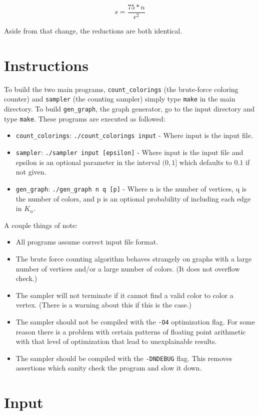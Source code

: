 \documentclass[14]{article}
\begin{document}
\[ s = \frac{75*n}{\epsilon^2} \]

Aside from that change, the reductions are both identical.

\section{Instructions}
To build the two main programs, \texttt{count\_colorings} (the brute-force coloring counter) and \texttt{sampler} (the counting sampler) simply type \texttt{make} in the main directory. To build \texttt{gen\_graph}, the graph generator, go to the input directory and type \texttt{make}. These programs are executed as followed:
\begin{itemize}
\item \texttt{count\_colorings}: \texttt{./count\_colorings input} - Where input is the input file.
\item \texttt{sampler}: \texttt{./sampler input [epsilon]} - Where input is the input file and epsilon is an optional parameter in the interval $(0,1]$ which defaults to $0.1$ if not given.
\item \texttt{gen\_graph}: \texttt{./gen\_graph n q [p]} - Where n is the number of vertices, q is the number of colors, and p is an optional probability of including each edge in $K_n$.
\end{itemize}
A couple things of note: 
\begin{itemize}
\item All programs assume correct input file format.
\item The brute force counting algorithm behaves strangely on graphs with a large number of vertices and/or a large number of colors. (It does not overflow check.)
\item The sampler will not terminate if it cannot find a valid color to color a vertex. (There is a warning about this if this is the case.)
\item The sampler should not be compiled with the \texttt{-O4} optimization flag. For some reason there is a problem with certain patterns of floating point arithmetic with that level of optimization that lead to unexplainable results.
\item The sampler should be compiled with the \texttt{-DNDEBUG} flag. This removes assertions which sanity check the program and slow it down.
\end{itemize}
\section{Input}
\end{document}
